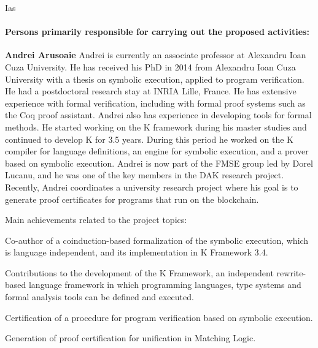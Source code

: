 \begin{sitedescription}{Ias}
\paragraph*{Persons primarily responsible for carrying out the proposed activities:}

\begin{compactitem} %
\item{\bf Andrei Arusoaie}
Andrei is currently an associate professor at Alexandru Ioan Cuza University. He has received his PhD in 2014 from Alexandru Ioan Cuza University with a thesis on symbolic execution, applied to program verification. He had a postdoctoral research stay at INRIA Lille, France. He has extensive experience with formal verification, including with formal proof systems such as the Coq proof assistant. Andrei also has experience in developing tools for formal methods. He started working on the K framework during his master studies and continued to develop K for 3.5 years. During this period he worked on the K compiler for language definitions, an engine for symbolic execution, and a prover based on symbolic execution. 
Andrei is now part of the FMSE group led by Dorel Lucanu, and he was one of the key members in the DAK research project. Recently, Andrei coordinates a university  research project where his goal is to generate proof certificates for programs that run on the blockchain.

Main achievements related to the project topics:
\begin{compactitem}
\item Co-author of a coinduction-based formalization of the symbolic execution, which is language independent, and its implementation in K Framework 3.4.
\item Contributions to the development of the K Framework, an independent rewrite-based language framework in which programming languages, type systems and formal analysis tools can be defined and executed.
\item Certification of a procedure for program verification based on symbolic execution.
\item Generation of proof certification for unification in Matching Logic.
\end{compactitem}


\end{compactitem}
\end{sitedescription}
